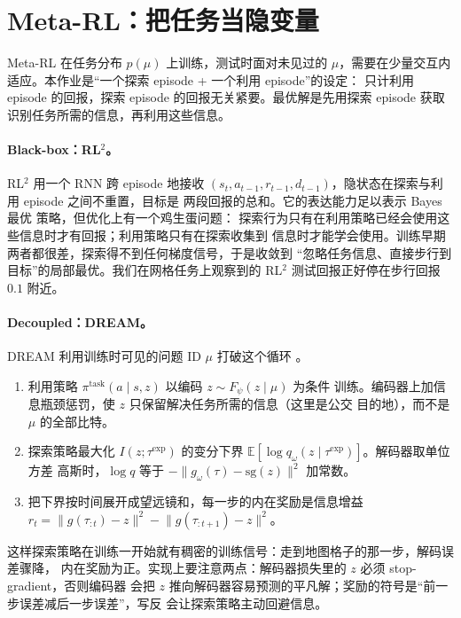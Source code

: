 \documentclass[10pt,twocolumn,a4paper]{ctexart}
\begin{document}
\section{Meta-RL：把任务当隐变量}
Meta-RL 在任务分布 $p(\mu)$ 上训练，测试时面对未见过的 $\mu$，需要在少量交互内
适应\citep{beck2023survey}。本作业是“一个探索 episode + 一个利用 episode”的设定：
只计利用 episode 的回报，探索 episode 的回报无关紧要。最优解是先用探索 episode
获取识别任务所需的信息，再利用这些信息。

\paragraph{Black-box：RL$^2$。}RL$^2$ 用一个 RNN 跨 episode 地接收
$(s_t,a_{t-1},r_{t-1},d_{t-1})$，隐状态在探索与利用 episode 之间不重置，目标是
两段回报的总和\citep{duan2016rl2,wang2016learning}。它的表达能力足以表示 Bayes 最优
策略\citep{zintgraf2020varibad,humplik2019meta}，但优化上有一个鸡生蛋问题：
探索行为只有在利用策略已经会使用这些信息时才有回报；利用策略只有在探索收集到
信息时才能学会使用。训练早期两者都很差，探索得不到任何梯度信号，于是收敛到
“忽略任务信息、直接步行到目标”的局部最优。我们在网格任务上观察到的 RL$^2$
测试回报正好停在步行回报 $0.1$ 附近。

\paragraph{Decoupled：DREAM。}DREAM 利用训练时可见的问题 ID $\mu$ 打破这个循环
\citep{liu2021dream}。
\begin{enumerate}
\item 利用策略 $\pi^{\text{task}}(a\mid s,z)$ 以编码 $z\sim F_\psi(z\mid\mu)$ 为条件
训练。编码器上加信息瓶颈惩罚，使 $z$ 只保留解决任务所需的信息（这里是公交
目的地），而不是 $\mu$ 的全部比特\citep{alemi2017vib}。
\item 探索策略最大化 $I(z;\tau^{\exp})$ 的变分下界
$\mathbb{E}[\log q_\omega(z\mid\tau^{\exp})]$\citep{barber2003im}。解码器取单位方差
高斯时，$\log q$ 等于 $-\lVert g_\omega(\tau)-\mathrm{sg}(z)\rVert^2$ 加常数。
\item 把下界按时间展开成望远镜和，每一步的内在奖励是信息增益
$r_t=\lVert g(\tau_{:t})-z\rVert^2-\lVert g(\tau_{:t+1})-z\rVert^2$。
\end{enumerate}
这样探索策略在训练一开始就有稠密的训练信号：走到地图格子的那一步，解码误差骤降，
内在奖励为正。实现上要注意两点：解码器损失里的 $z$ 必须 stop-gradient，否则编码器
会把 $z$ 推向解码器容易预测的平凡解；奖励的符号是“前一步误差减后一步误差”，写反
会让探索策略主动回避信息。
\end{document}
